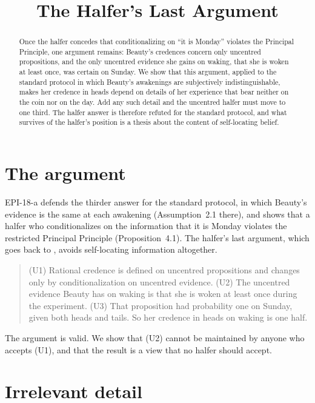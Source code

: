\documentclass{situationist-preprint}
\title{The Halfer's Last Argument}
\begin{document}
\maketitle

\begin{abstract}
Once the halfer concedes that conditionalizing on \enquote{it is Monday} violates the Principal Principle, one argument remains: Beauty's credences concern only uncentred propositions, and the only uncentred evidence she gains on waking, that she is woken at least once, was certain on Sunday. We show that this argument, applied to the standard protocol in which Beauty's awakenings are subjectively indistinguishable, makes her credence in heads depend on details of her experience that bear neither on the coin nor on the day. Add any such detail and the uncentred halfer must move to one third. The halfer answer is therefore refuted for the standard protocol, and what survives of the halfer's position is a thesis about the content of self-locating belief.
\end{abstract}

\section{The argument}

EPI-18-a defends the thirder answer for the standard protocol, in which Beauty's evidence is the same at each awakening (Assumption~2.1 there), and shows that a halfer who conditionalizes on the information that it is Monday violates the restricted Principal Principle (Proposition~4.1). The halfer's last argument, which goes back to \citet{Lewis2001}, avoids self-locating information altogether.

\begin{quote}
(U1) Rational credence is defined on uncentred propositions and changes only by conditionalization on uncentred evidence. (U2) The uncentred evidence Beauty has on waking is that she is woken at least once during the experiment. (U3) That proposition had probability one on Sunday, given both heads and tails. So her credence in heads on waking is one half.
\end{quote}

The argument is valid. We show that (U2) cannot be maintained by anyone who accepts (U1), and that the result is a view that no halfer should accept.

\section{Irrelevant detail}
\end{document}
